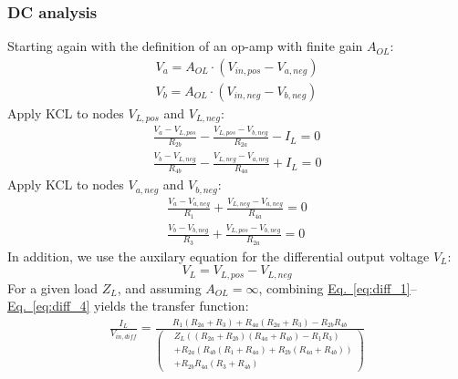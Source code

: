 \documentclass[10pt]{article}
\newcommand{\briefeqlink}[1]{\hyperref[#1]{Eq.~\ref*{#1}}\xspace }
\begin{document}
\subsubsection{DC analysis}

Starting again with the definition of an op-amp with finite gain $A_{OL}$:
\begin{subequations}
\label{eq:diff_1}
\begin{gather}
V_a = A_{OL}\cdot(V_{in,pos} - V_{a,neg})\\
V_b = A_{OL}\cdot(V_{in,neg} - V_{b,neg})
\end{gather}
\end{subequations}
Apply KCL to nodes $V_{L,pos}$ and $V_{L,neg}$:
\begin{subequations}
\label{eq:diff_2}
\begin{gather}
\frac{V_a - V_{L,pos}}{R_{2b}} - \frac{V_{L,pos} - V_{b,neg}}{R_{2a}} - I_L = 0\\
\frac{V_b - V_{L,neg}}{R_{4b}} - \frac{V_{L,neg} - V_{a,neg}}{R_{4a}} + I_L = 0
\end{gather}
\end{subequations}
Apply KCL to nodes $V_{a,neg}$ and $V_{b,neg}$:
\begin{subequations}
\label{eq:diff_3}
\begin{gather}
\frac{V_a - V_{a,neg}}{R_1} + \frac{V_{L,neg} - V_{a,neg}}{R_{4a}} = 0\\
\frac{V_b - V_{b,neg}}{R_3} + \frac{V_{L,pos} - V_{b,neg}}{R_{2a}} = 0
\end{gather}
\end{subequations}
In addition, we use the auxilary equation for the differential output voltage $V_L$:
\begin{equation}
\label{eq:diff_4}
V_L = V_{L,pos} - V_{L,neg}
\end{equation}
For a given load $Z_L$, and assuming $A_{OL}=\infty$, combining \briefeqlink{eq:diff_1}--\briefeqlink{eq:diff_4} yields the transfer function:
\begin{align}
\label{eq:diff_howland_transfer_function}
\frac{I_L}{V_{in,diff}} = \frac{R_1 (R_{2a} + R_3) + R_{4a} (R_{2a} + R_3) - R_{2b} R_{4b} }{ \left( \begin{aligned}&Z_L((R_{2a} + R_{2b})(R_{4a} + R_{4b}) - R_1 R_3)\\&+ R_{2a}(R_{4b}(R_1 + R_{4a}) + R_{2b}(R_{4a}+R_{4b}))\\&+ R_{2b}R_{4a}(R_3+R_{4b})\end{aligned}\right)}
\end{align}
\end{document}
